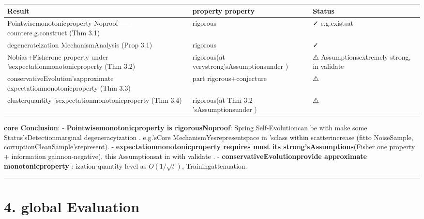 \documentclass[
  12pt,
]{article}
\begin{document}
\begin{longtable}[]{@{}
  >{\raggedright\arraybackslash}p{}
  >{\raggedright\arraybackslash}p{}
  >{\raggedright\arraybackslash}p{}@{}}
\toprule\noalign{}
\begin{minipage}[b]{\linewidth}\raggedright
Result
\end{minipage} & \begin{minipage}[b]{\linewidth}\raggedright
property property
\end{minipage} & \begin{minipage}[b]{\linewidth}\raggedright
Status
\end{minipage} \\
\midrule\noalign{}
\endhead
\bottomrule\noalign{}
\endlastfoot
Pointwisemonotonicproperty Noproof------countere.g.construct  (Thm 3.1) & rigorous & ✓ e.g.existsat  \\
degenerateization MechanismAnalysis (Prop 3.1) & rigorous & ✓ \\
Nobias+Fisherone property under 'sexpectationmonotonicproperty  (Thm 3.2) & rigorous(at verystrong'sAssumptionsunder ) & ⚠
Assumptionsextremely strong, in validate  \\
conservativeEvolution'sapproximate expectationmonotonicproperty  (Thm 3.3) & part rigorous+conjecture & ⚠ \\
clusterquantity 'sexpectationmonotonicproperty  (Thm 3.4) & rigorous(at  Thm 3.2 'sAssumptionsunder ) & ⚠ \\
\end{longtable}

\textbf{core Conclusion}:  - \textbf{Pointwisemonotonicproperty is rigorousNoproof}: Spring
Self-Evolutioncan be with make some Status'sDetectionmarginal degeneracyization . e.g.'sCore MechanismYesrepresentspace in 'sclass within scatterincrease (fitto NoiseSample, corruptionCleanSample'srepresent). 
- \textbf{expectationmonotonicproperty requires must its strong'sAssumptions}(Fisher one property  +
information gainnon-negative), this Assumptionsat in with validate .  -
\textbf{conservativeEvolutionprovide approximate monotonicproperty }: ization quantity level as 
\(O(1/\sqrt{t})\), Trainingattenuation. 

\begin{center}\rule{0.5\linewidth}{0.5pt}\end{center}

\section{4. global Evaluation}\label{ux5168ux5c40ux8bdaux5b9eux8bc4ux4f30}
\end{document}
